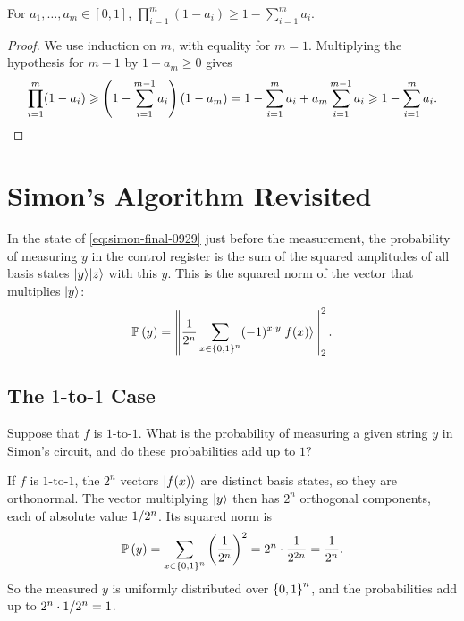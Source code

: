 \begin{claim}\label{lem:prodsum-1001}
    For $a_1, \dots, a_m \in [0, 1]$, $\prod_{i=1}^{m} (1 - a_i) \geq 1 - \sum_{i=1}^{m} a_i$.
\end{claim}

\begin{proof}
    We use induction on $m$, with equality for $m = 1$. Multiplying the hypothesis for $m - 1$ by
    $1 - a_m \geq 0$ gives
    \[\prod_{i=1}^{m} (1 - a_i) \geq \left(1 - \sum_{i=1}^{m-1} a_i\right)(1 - a_m)
        = 1 - \sum_{i=1}^{m} a_i + a_m \sum_{i=1}^{m-1} a_i \geq 1 - \sum_{i=1}^{m} a_i. \qedhere\]
\end{proof}

\section{Simon's Algorithm Revisited}

In the state of \cref{eq:simon-final-0929} just before the measurement, the probability of measuring
$y$ in the control register is the sum of the squared amplitudes of all basis states
$\ket{y}\ket{z}$ with this $y$. This is the squared norm of the vector that multiplies $\ket{y}$:
\[\prob{y} = \norm{\frac{1}{2^n} \sum_{x \in \set{0,1}^n} (-1)^{x \cdot y} \ket{f(x)}}_2^2.\]

\subsection{The \texorpdfstring{$1$}{1}-to-\texorpdfstring{$1$}{1} Case}

\begin{exercisebox}
\begin{exercise}\label{ex:simon-11-1001}
    Suppose that $f$ is $1$-to-$1$. What is the probability of measuring a given string $y$ in Simon's
    circuit, and do these probabilities add up to $1$?
\end{exercise}
\tcblower
\begin{wsolution}
    If $f$ is $1$-to-$1$, the $2^n$ vectors $\ket{f(x)}$ are distinct basis states, so they are
    orthonormal. The vector multiplying $\ket{y}$ then has $2^n$ orthogonal components, each of
    absolute value $\sfrac{1}{2^n}$. Its squared norm is
    \[\prob{y} = \sum_{x \in \set{0,1}^n} \left(\frac{1}{2^n}\right)^2 = 2^n \cdot \frac{1}{2^{2n}} = \frac{1}{2^n}.\]
    So the measured $y$ is uniformly distributed over $\set{0,1}^n$, and the probabilities add up to
    $2^n \cdot \sfrac{1}{2^n} = 1$.
\end{wsolution}
\end{exercisebox}

